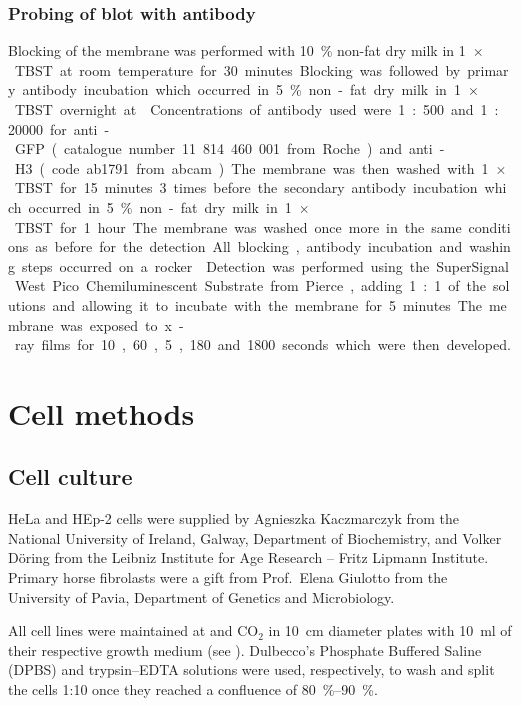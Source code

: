    \subsubsection{Probing of blot with antibody}
      Blocking of the membrane was performed with \SI{10}{\percent} non-fat dry milk in \SI{1}{$\times$} TBST
      at room temperature for 30 minutes. Blocking was followed by primary antibody
      incubation which occurred in \SI{5}{\percent} non-fat dry milk in \SI{1}{$\times$} TBST overnight at
      . Concentrations of antibody used were 1:500 and 1:20000 for anti-GFP
      (catalogue number 11 814 460 001 from Roche) and anti-H3 (code ab1791 from
      abcam). The membrane was then washed with \SI{1}{$\times$} TBST for 15 minutes 3 times
      before the secondary antibody incubation which occurred in \SI{5}{\percent} non-fat dry
      milk in \SI{1}{$\times$} TBST for 1 hour. The membrane was washed once more in the same
      conditions as before for the detection. All blocking, antibody incubation and
      washing steps occurred on a rocker.
      
      Detection was performed using the SuperSignal West Pico Chemiluminescent
      Substrate from Pierce, adding 1:1 of the solutions and allowing it to incubate
      with the membrane for 5 minutes. The membrane was exposed to x-ray films for
      10, 60, 5, 180 and 1800 seconds which were then developed.


\section{Cell methods}
  \subsection{Cell culture}
    HeLa and HEp-2 cells were supplied by Agnieszka Kaczmarczyk from the
    National University of Ireland, Galway, Department of Biochemistry,
    and Volker D\"oring from the Leibniz Institute for Age Research -- Fritz Lipmann Institute.
    Primary horse fibrolasts were a gift from Prof.~Elena Giulotto from the
    University of Pavia, Department of Genetics and Microbiology.

    All cell lines were maintained at  and  CO$_2$ in \SI{10}{\cm}
    diameter plates with \SI{10}{\ml} of their respective growth medium (see ).
    Dulbecco's Phosphate Buffered
    Saline (DPBS) and trypsin--EDTA solutions were used, respectively, to wash
    and split the cells 1:10 once they reached a confluence of \SIrange{80}{90}{\percent}.

